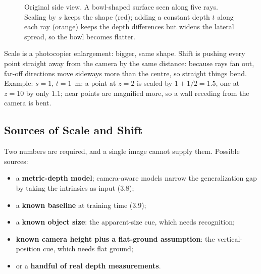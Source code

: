 \documentclass[11pt,a4paper]{article}
\theoremstyle{definition}
\theoremstyle{plain}
\theoremstyle{remark}
\begin{document}
\begin{figure}[H]
\centering
{}
\caption{Original side view. A bowl-shaped surface seen along five rays. Scaling by $s$ keeps the shape (red); adding a constant depth $t$ along each ray (orange) keeps the depth differences but widens the lateral spread, so the bowl becomes flatter.}
\end{figure}

\begin{intuition}
Scale is a photocopier enlargement: bigger, same shape. Shift is pushing every point straight away from the camera by the same distance: because rays fan out, far-off directions move sideways more than the centre, so straight things bend. Example: $s=1$, $t=1$~m: a point at $z=2$ is scaled by $1+1/2=1.5$, one at $z=10$ by only $1.1$; near points are magnified more, so a wall receding from the camera is bent.
\end{intuition}

\subsection{Sources of Scale and Shift }
Two numbers are required, and a single image cannot supply them. Possible sources:
\begin{itemize}[nosep]
 \item a \textbf{metric-depth model}; camera-aware models narrow the generalization gap by taking the intrinsics as input (3.8);
 \item a \textbf{known baseline} at training time (3.9);
 \item a \textbf{known object size}: the apparent-size cue, which needs recognition;
 \item \textbf{known camera height plus a flat-ground assumption}: the vertical-position cue, which needs flat ground;
 \item or a \textbf{handful of real depth measurements}.
\end{itemize}
\end{document}
